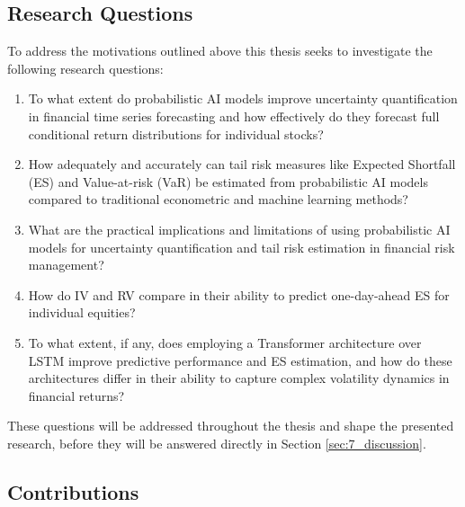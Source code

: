\subsection{Research Questions}
\label{sec:research_questions}

To address the motivations outlined above this thesis seeks to investigate the following research questions: 
\begin{enumerate}[label=RQ\arabic*:, leftmargin=1.4cm]
    \item To what extent do probabilistic AI models improve uncertainty quantification in financial time series forecasting and how effectively do they forecast full conditional return distributions for individual stocks?
    \item How adequately and accurately can tail risk measures like Expected Shortfall (ES) and Value-at-risk (VaR) be estimated from probabilistic AI models compared to traditional econometric and machine learning methods?
    
    \item What are the practical implications and limitations of using probabilistic AI models for uncertainty quantification and tail risk estimation in financial risk management? 
    \item How do IV and RV compare in their ability to predict one-day-ahead ES for individual equities? 
    \item To what extent, if any, does employing a Transformer architecture over LSTM improve predictive performance and ES estimation, and how do these architectures differ in their ability to capture complex volatility dynamics in financial returns?
\end{enumerate}

These questions will be addressed throughout the thesis and shape the presented research, before they will be answered directly in Section \ref{sec:7_discussion}.   


\subsection{Contributions}
\label{sec:contributions}


